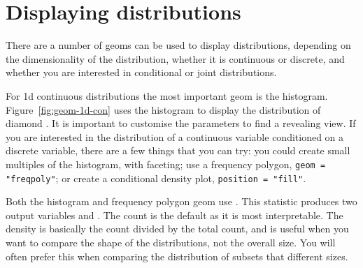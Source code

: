 % 



\section{Displaying distributions}\label{sec:distributions}

There are a number of geoms can be used to display distributions, depending on the dimensionality of the distribution, whether it is continuous or discrete, and whether you are interested in conditional or joint distributions.

For 1d continuous distributions the most important geom is the histogram.  Figure~\ref{fig:geom-1d-con} uses the histogram to display the distribution of diamond .  It is important to customise the parameters to find a revealing view.  If you are interested in the distribution of a continuous variable conditioned on a discrete variable, there are a few things that you can try: you could create small multiples of the histogram,  with faceting; use a frequency polygon, {\tt geom = "freqpoly"}; or create a conditional density plot, {\tt position = "fill"}.  

Both the histogram and frequency polygon geom use .  This statistic produces two output variables  and .  The count is the default as it is most interpretable.  The density is basically the count divided by the total count, and is useful when you want to compare the shape of the distributions, not the overall size.  You will often prefer this when comparing the distribution of subsets that different sizes.

